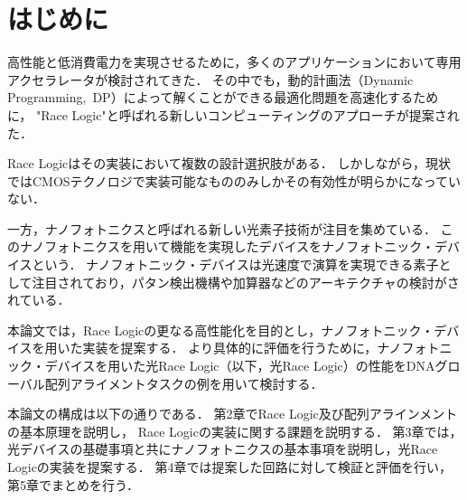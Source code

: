 \chapter{はじめに}
高性能と低消費電力を実現させるために，多くのアプリケーションにおいて専用アクセラレータが検討されてきた．
その中でも，動的計画法（Dynamic Programming, DP）によって解くことができる最適化問題を高速化するために，
"Race Logic"と呼ばれる新しいコンピューティングのアプローチが提案された\cite{madhavan2014race}．

Race Logicはその実装において複数の設計選択肢がある．
しかしながら，現状ではCMOSテクノロジで実装可能なもののみしかその有効性が明らかになっていない．

一方，ナノフォトニクスと呼ばれる新しい光素子技術が注目を集めている．
このナノフォトニクスを用いて機能を実現したデバイスをナノフォトニック・デバイスという．
ナノフォトニック・デバイスは光速度で演算を実現できる素子として注目されており，パタン検出機構や加算器などのアーキテクチャの検討がされている．

本論文では，Race Logicの更なる高性能化を目的とし，ナノフォトニック・デバイスを用いた実装を提案する．
より具体的に評価を行うために，ナノフォトニック・デバイスを用いた光Race Logic（以下，光Race Logic）の性能をDNAグローバル配列アライメントタスクの例を用いて検討する．

本論文の構成は以下の通りである．
第2章でRace Logic及び配列アラインメントの基本原理を説明し，
Race Logicの実装に関する課題を説明する．
第3章では，光デバイスの基礎事項と共にナノフォトニクスの基本事項を説明し，光Race Logicの実装を提案する．
第4章では提案した回路に対して検証と評価を行い，第5章でまとめを行う．

